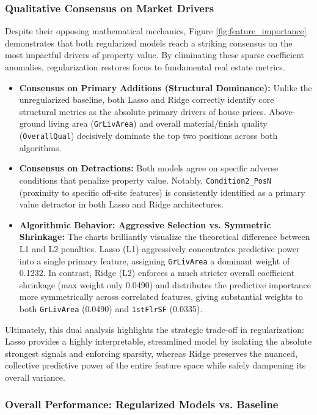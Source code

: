 \documentclass[11pt]{article}
\begin{document}
\subsubsection{Qualitative Consensus on Market Drivers}
Despite their opposing mathematical mechanics, Figure \ref{fig:feature_importance} demonstrates that both regularized models reach a striking consensus on the most impactful drivers of property value. By eliminating these sparse coefficient anomalies, regularization restores focus to fundamental real estate metrics.

\begin{itemize}
    \item \textbf{Consensus on Primary Additions (Structural Dominance):} Unlike the unregularized baseline, both Lasso and Ridge correctly identify core structural metrics as the absolute primary drivers of house prices. Above-ground living area (\texttt{GrLivArea}) and overall material/finish quality (\texttt{OverallQual}) decisively dominate the top two positions across both algorithms.
    
    \item \textbf{Consensus on Detractions:} Both models agree on specific adverse conditions that penalize property value. Notably, \texttt{Condition2\_PosN} (proximity to specific off-site features) is consistently identified as a primary value detractor in both Lasso and Ridge architectures.
    
    \item \textbf{Algorithmic Behavior: Aggressive Selection vs. Symmetric Shrinkage:} The charts brilliantly visualize the theoretical difference between L1 and L2 penalties. Lasso (L1) aggressively concentrates predictive power into a single primary feature, assigning \texttt{GrLivArea} a dominant weight of 0.1232. In contrast, Ridge (L2) enforces a much stricter overall coefficient shrinkage (max weight only 0.0490) and distributes the predictive importance more symmetrically across correlated features, giving substantial weights to both \texttt{GrLivArea} (0.0490) and \texttt{1stFlrSF} (0.0335).
\end{itemize}

Ultimately, this dual analysis highlights the strategic trade-off in regularization: Lasso provides a highly interpretable, streamlined model by isolating the absolute strongest signals and enforcing sparsity, whereas Ridge preserves the nuanced, collective predictive power of the entire feature space while safely dampening its overall variance.
\subsubsection{Overall Performance: Regularized Models vs. Baseline}
\end{document}
